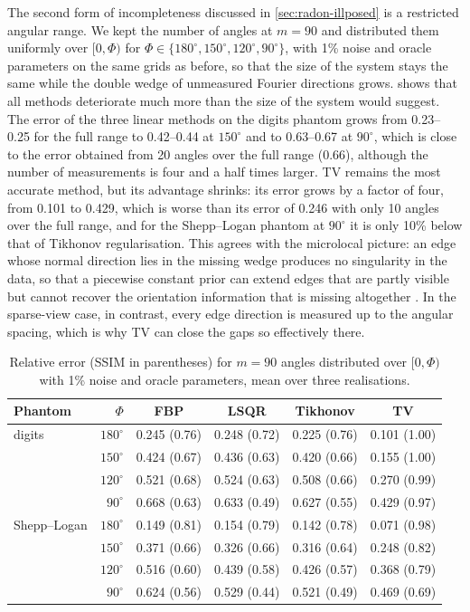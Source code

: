 \documentclass[11pt,a4paper]{article}
\numberwithin{equation}{section}
\theoremstyle{remark}
\begin{document}
The second form of incompleteness discussed in \cref{sec:radon-illposed} is a restricted angular range. We kept the number of angles at $m=90$ and distributed them uniformly over $[0,\Phi)$ for $\Phi\in\{180^\circ,150^\circ,120^\circ,90^\circ\}$, with 1\% noise and oracle parameters on the same grids as before, so that the size of the system stays the same while the double wedge of unmeasured Fourier directions grows.  shows that all methods deteriorate much more than the size of the system would suggest. The error of the three linear methods on the digits phantom grows from 0.23--0.25 for the full range to 0.42--0.44 at $150^\circ$ and to 0.63--0.67 at $90^\circ$, which is close to the error obtained from 20 angles over the full range (0.66), although the number of measurements is four and a half times larger. TV remains the most accurate method, but its advantage shrinks: its error grows by a factor of four, from 0.101 to 0.429, which is worse than its error of 0.246 with only 10 angles over the full range, and for the Shepp--Logan phantom at $90^\circ$ it is only 10\% below that of Tikhonov regularisation. This agrees with the microlocal picture: an edge whose normal direction lies in the missing wedge produces no singularity in the data, so that a piecewise constant prior can extend edges that are partly visible but cannot recover the orientation information that is missing altogether \citep{quinto1993}. In the sparse-view case, in contrast, every edge direction is measured up to the angular spacing, which is why TV can close the gaps so effectively there.

\begin{table}[t]
\centering
\caption{Relative error (SSIM in parentheses) for $m=90$ angles distributed over $[0,\Phi)$ with 1\% noise and oracle parameters, mean over three realisations.}\label{tab:limited}
\small
\begin{tabular}{lr cccc}
\toprule
Phantom & $\Phi$ & FBP & LSQR & Tikhonov & TV \\
\midrule
digits & $180^\circ$ & 0.245 (0.76) & 0.248 (0.72) & 0.225 (0.76) & 0.101 (1.00) \\
 & $150^\circ$ & 0.424 (0.67) & 0.436 (0.63) & 0.420 (0.66) & 0.155 (1.00) \\
 & $120^\circ$ & 0.521 (0.68) & 0.524 (0.63) & 0.508 (0.66) & 0.270 (0.99) \\
 & $90^\circ$ & 0.668 (0.63) & 0.633 (0.49) & 0.627 (0.55) & 0.429 (0.97) \\
\midrule
Shepp--Logan & $180^\circ$ & 0.149 (0.81) & 0.154 (0.79) & 0.142 (0.78) & 0.071 (0.98) \\
 & $150^\circ$ & 0.371 (0.66) & 0.326 (0.66) & 0.316 (0.64) & 0.248 (0.82) \\
 & $120^\circ$ & 0.516 (0.60) & 0.439 (0.58) & 0.426 (0.57) & 0.368 (0.79) \\
 & $90^\circ$ & 0.624 (0.56) & 0.529 (0.44) & 0.521 (0.49) & 0.469 (0.69) \\
\bottomrule
\end{tabular}
\end{table}
\end{document}
